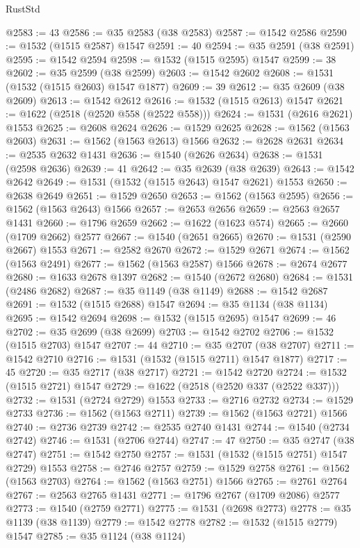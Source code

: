\begin{lexlean}{RustStd}
\begin{coremodule}
@2583 := 43
@2586 := @35 @2583 (@38 @2583)
@2587 := @1542 @2586
@2590 := @1532 (@1515 @2587) @1547
@2591 := 40
@2594 := @35 @2591 (@38 @2591)
@2595 := @1542 @2594
@2598 := @1532 (@1515 @2595) @1547
@2599 := 38
@2602 := @35 @2599 (@38 @2599)
@2603 := @1542 @2602
@2608 := @1531 (@1532 (@1515 @2603) @1547 @1877)
@2609 := 39
@2612 := @35 @2609 (@38 @2609)
@2613 := @1542 @2612
@2616 := @1532 (@1515 @2613) @1547
@2621 := @1622 (@2518 (@2520 @558 (@2522 @558)))
@2624 := @1531 (@2616 @2621) @1553
@2625 := @2608 @2624
@2626 := @1529 @2625
@2628 := @1562 (@1563 @2603)
@2631 := @1562 (@1563 @2613) @1566
@2632 := @2628 @2631
@2634 := @2535 @2632 @1431
@2636 := @1540 (@2626 @2634)
@2638 := @1531 (@2598 @2636)
@2639 := 41
@2642 := @35 @2639 (@38 @2639)
@2643 := @1542 @2642
@2649 := @1531 (@1532 (@1515 @2643) @1547 @2621) @1553
@2650 := @2638 @2649
@2651 := @1529 @2650
@2653 := @1562 (@1563 @2595)
@2656 := @1562 (@1563 @2643) @1566
@2657 := @2653 @2656
@2659 := @2563 @2657 @1431
@2660 := @1796 @2659
@2662 := @1622 (@1623 @574)
@2665 := @2660 (@1709 @2662) @2577
@2667 := @1540 (@2651 @2665)
@2670 := @1531 (@2590 @2667) @1553
@2671 := @2582 @2670
@2672 := @1529 @2671
@2674 := @1562 (@1563 @2491)
@2677 := @1562 (@1563 @2587) @1566
@2678 := @2674 @2677
@2680 := @1633 @2678 @1397
@2682 := @1540 (@2672 @2680)
@2684 := @1531 (@2486 @2682)
@2687 := @35 @1149 (@38 @1149)
@2688 := @1542 @2687
@2691 := @1532 (@1515 @2688) @1547
@2694 := @35 @1134 (@38 @1134)
@2695 := @1542 @2694
@2698 := @1532 (@1515 @2695) @1547
@2699 := 46
@2702 := @35 @2699 (@38 @2699)
@2703 := @1542 @2702
@2706 := @1532 (@1515 @2703) @1547
@2707 := 44
@2710 := @35 @2707 (@38 @2707)
@2711 := @1542 @2710
@2716 := @1531 (@1532 (@1515 @2711) @1547 @1877)
@2717 := 45
@2720 := @35 @2717 (@38 @2717)
@2721 := @1542 @2720
@2724 := @1532 (@1515 @2721) @1547
@2729 := @1622 (@2518 (@2520 @337 (@2522 @337)))
@2732 := @1531 (@2724 @2729) @1553
@2733 := @2716 @2732
@2734 := @1529 @2733
@2736 := @1562 (@1563 @2711)
@2739 := @1562 (@1563 @2721) @1566
@2740 := @2736 @2739
@2742 := @2535 @2740 @1431
@2744 := @1540 (@2734 @2742)
@2746 := @1531 (@2706 @2744)
@2747 := 47
@2750 := @35 @2747 (@38 @2747)
@2751 := @1542 @2750
@2757 := @1531 (@1532 (@1515 @2751) @1547 @2729) @1553
@2758 := @2746 @2757
@2759 := @1529 @2758
@2761 := @1562 (@1563 @2703)
@2764 := @1562 (@1563 @2751) @1566
@2765 := @2761 @2764
@2767 := @2563 @2765 @1431
@2771 := @1796 @2767 (@1709 @2086) @2577
@2773 := @1540 (@2759 @2771)
@2775 := @1531 (@2698 @2773)
@2778 := @35 @1139 (@38 @1139)
@2779 := @1542 @2778
@2782 := @1532 (@1515 @2779) @1547
@2785 := @35 @1124 (@38 @1124)

\end{coremodule}
\end{lexlean}
